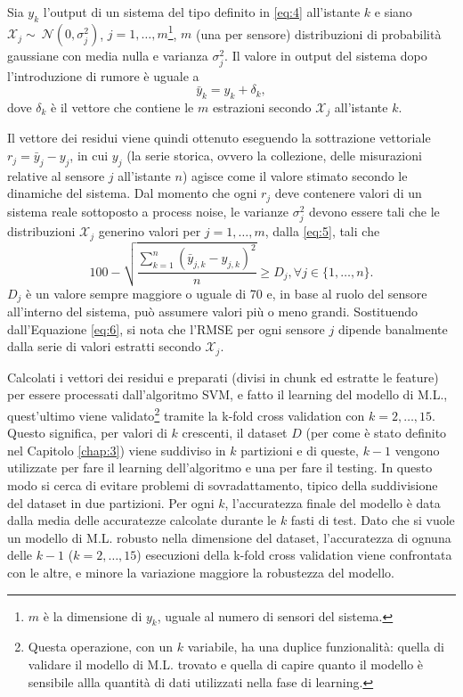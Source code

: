 \documentclass[Lau,binding=0.6cm]{sapthesis}
\begin{document}
Sia $y_k$ l'output di un sistema del tipo definito in \ref{eq:4} all'istante $k$ e siano $\mathcal{X}_j \sim~\mathcal{N}(0,\sigma_j^2)$, $j = 1,\ldots,m$\footnote{{$m$ \`e la dimensione di $y_k$, uguale al numero di sensori del sistema.}}, $m$ (una per sensore) distribuzioni di probabilit\`a gaussiane con media nulla e varianza $\sigma_j^2$.
Il valore in output del sistema dopo l'introduzione di rumore \`e uguale a
\begin{equation}
    \bar{y}_k = y_k + \delta_k\label{eq:6},
\end{equation}
dove $\delta_k$ \`e il vettore che contiene le $m$ estrazioni secondo $\mathcal{X}_j$ all'istante $k$.

Il vettore dei residui viene quindi ottenuto eseguendo la sottrazione vettoriale $r_j = \bar{y}_j - y_j$, in cui $y_j$ (la serie storica, ovvero la collezione, delle misurazioni relative al sensore $j$ all'istante $n$) agisce come il valore stimato secondo le dinamiche del sistema.
Dal momento che ogni $r_j$ deve contenere valori di un sistema reale sottoposto a process noise, le varianze $\sigma_j^2$ devono essere tali che le distribuzioni $\mathcal{X}_j$ generino valori per $j=1,\ldots,m$, dalla \ref{eq:5}, tali che
\begin{equation}
    100 - \sqrt{\frac{\sum_{k=1}^n (\bar{y}_{j,k} - y_{j,k})^2}{n}} \geq D_j, \forall j\in\{1,\ldots,n\}\label{eq:7}.
\end{equation}
$D_j$ \`e un valore sempre maggiore o uguale di 70 e, in base al ruolo del sensore all'interno del sistema, pu\`o assumere valori pi\`u o meno grandi.
Sostituendo dall'Equazione \ref{eq:6}, si nota che l'RMSE per ogni sensore $j$ dipende banalmente dalla serie di valori estratti secondo $\mathcal{X}_j$.

Calcolati i vettori dei residui e preparati (divisi in chunk ed estratte le feature) per essere processati dall'algoritmo SVM, e fatto il learning del modello di M.L., 
quest'ultimo viene validato\footnote{Questa operazione, con un $k$ variabile, ha una duplice funzionalit\`a: quella di validare il modello di M.L. trovato e quella di capire quanto il modello \`e sensibile allla quantit\`a di dati utilizzati nella fase di learning.}
tramite la k-fold cross validation con $k=2,\ldots,15$.
Questo significa, per valori di $k$ crescenti, il dataset $D$ (per come \`e stato definito nel Capitolo \ref{chap:3}) viene suddiviso in $k$ partizioni e di queste, $k-1$ vengono utilizzate per fare il learning dell'algoritmo e una per fare il testing.
In questo modo si cerca di evitare problemi di sovradattamento, tipico della suddivisione del dataset in due partizioni.
Per ogni $k$, l'accuratezza finale del modello \`e data dalla media delle accuratezze calcolate durante le $k$ fasti di test.
Dato che si vuole un modello di M.L. robusto nella dimensione del dataset, l'accuratezza di ognuna delle $k-1$ ($k = 2,\ldots,15$) esecuzioni della k-fold cross validation viene confrontata con le altre, e minore la variazione maggiore la robustezza del modello.
\end{document}
